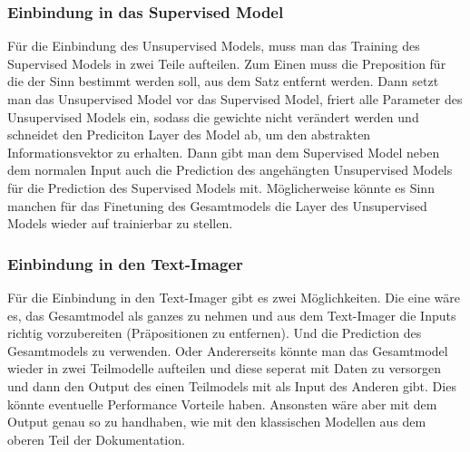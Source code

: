 \documentclass[10pt,a4paper]{article}
\begin{document}
\subsubsection{Einbindung in das Supervised Model}
\begin{flushleft}
Für die Einbindung des Unsupervised Models, muss man das Training des Supervised Models in zwei Teile aufteilen. Zum Einen muss die Preposition für die der Sinn bestimmt werden soll, aus dem Satz entfernt werden. Dann setzt man das Unsupervised Model vor das Supervised Model, friert alle Parameter des Unsupervised Models ein, sodass die gewichte nicht verändert werden und schneidet den Prediciton Layer des Model ab, um den abstrakten Informationsvektor zu erhalten. Dann gibt man dem Supervised Model neben dem normalen Input auch die Prediction des angehängten Unsupervised Models für die Prediction des Supervised Models mit.
Möglicherweise könnte es Sinn manchen für das Finetuning des Gesamtmodels die Layer des Unsupervised Models wieder auf trainierbar zu stellen.
\end{flushleft}

\subsubsection{Einbindung in den Text-Imager}
\begin{flushleft}
Für die Einbindung in den Text-Imager gibt es zwei Möglichkeiten. Die eine wäre es, das Gesamtmodel als ganzes zu nehmen und aus dem Text-Imager die Inputs richtig vorzubereiten (Präpositionen zu entfernen). Und die Prediction des Gesamtmodels zu verwenden. Oder Andererseits könnte man das Gesamtmodel wieder in zwei Teilmodelle aufteilen und diese seperat mit Daten zu versorgen und dann den Output des einen Teilmodels mit als Input des Anderen gibt. Dies könnte eventuelle Performance Vorteile haben.
Ansonsten wäre aber mit dem Output genau so zu handhaben, wie mit den klassischen Modellen aus dem oberen Teil der Dokumentation.
\end{flushleft}
\newpage

\begingroup
\raggedright
\sloppy
\printbibliography
\endgroup
\end{document}
